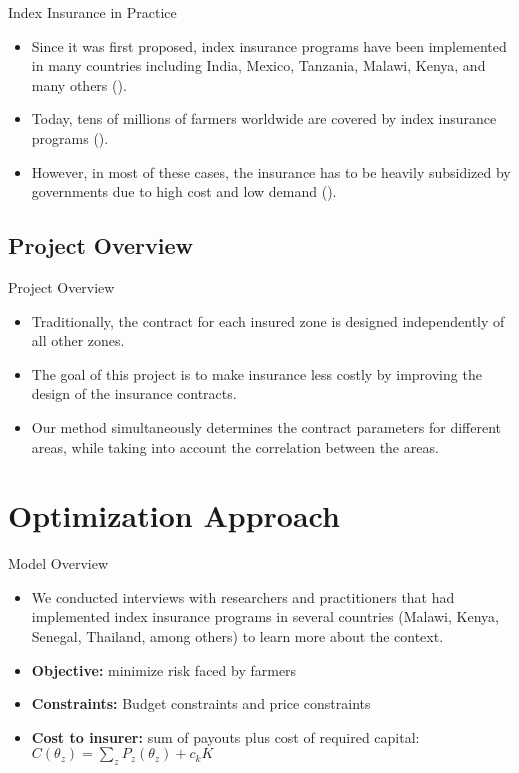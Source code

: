 \documentclass{beamer}
\begin{document}
\begin{frame}{Index Insurance in Practice}
\begin{itemize}
    \setlength\itemsep{1.5em}
    \item Since it was first proposed, index insurance programs have been implemented in many countries including India, Mexico, Tanzania, Malawi, Kenya, and many others (\cite{jensen2017agricultural}). 
    
    \item Today, tens of millions of farmers worldwide are covered by index insurance programs (\cite{greatrex2015scaling}). 
    
    \item However, in most of these cases, the insurance has to be heavily subsidized by governments due to high cost and low demand (\cite{greatrex2015scaling}). 
\end{itemize}
\end{frame}

\subsection{Project Overview}
\begin{frame}{Project Overview}
 \begin{itemize}
    \setlength\itemsep{1em}
    \item Traditionally, the contract for each insured zone is designed independently of all other zones.
     \item The goal of this project is to make insurance less costly by improving the design of the insurance contracts. 
    \item Our method simultaneously determines the contract parameters for different areas, while taking into account the correlation between the areas. 
 \end{itemize}
\end{frame}





\section{Optimization Approach}
\begin{frame}{Model Overview}
    \begin{itemize}
       \setlength\itemsep{1.5em}
        \item We conducted interviews with researchers and practitioners that had implemented index insurance programs in several countries (Malawi, Kenya, Senegal, Thailand, among others) to learn more about the context. 
        \item \textbf{Objective:} minimize risk faced by farmers 
        \item \textbf{Constraints:} Budget constraints and price constraints
        \item \textbf{Cost to insurer:} sum of payouts plus cost of required capital: $C(\theta_z) = \sum_z P_z(\theta_z) + c_k K$
    \end{itemize}    
    \end{frame}
\end{document}
